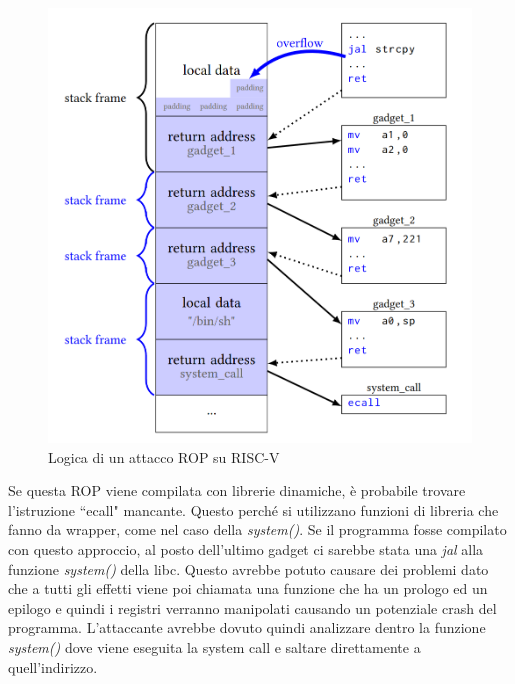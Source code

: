 \vspace{1cm}
\FloatBarrier
\begin{figure}[!htbp]
    \centering
    \includegraphics[width=0.8\linewidth]{images/riscv-rop.png}
    \caption{Logica di un attacco ROP su RISC-V}
    \label{ref:riscv-rop}
\end{figure}
\FloatBarrier
\vspace{1cm}
Se questa ROP viene compilata con librerie dinamiche, è probabile trovare l'istruzione ``ecall" mancante. Questo perché si utilizzano funzioni di libreria che fanno da wrapper, come nel caso della \textit{system()}. Se il programma fosse compilato con questo approccio, al posto dell'ultimo gadget ci sarebbe stata una \textit{jal} alla funzione \textit{system()} della libc. Questo avrebbe potuto causare dei problemi dato che a tutti gli effetti viene poi chiamata una funzione che ha un prologo ed un epilogo e quindi i registri verranno manipolati causando un potenziale crash del programma. L'attaccante avrebbe dovuto quindi analizzare dentro la funzione \textit{system()} dove viene eseguita la system call e saltare direttamente a quell'indirizzo.

